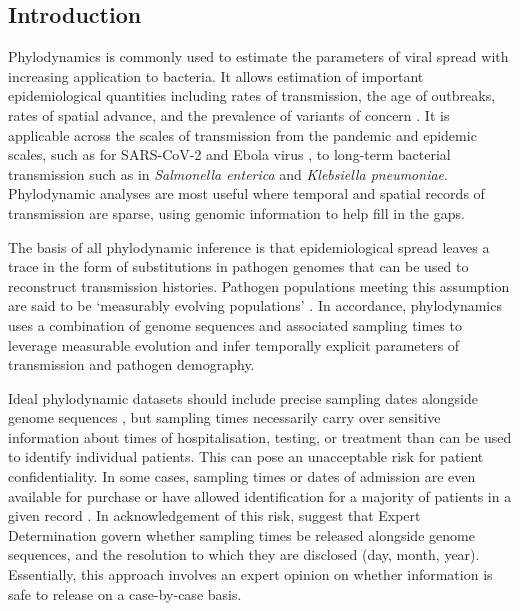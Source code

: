 \documentclass[12pt]{article}
\begin{document}
\begin{spacing}{2}

\section*{Introduction}
Phylodynamics is commonly used to estimate the parameters of viral spread with increasing application to bacteria. It allows estimation of important epidemiological quantities including rates of transmission, the age of outbreaks, rates of spatial advance, and the prevalence of variants of concern \citep{featherstone2022epidemiological, attwood2022phylogenetic, du2015getting,volz_fitness_2023}. It is applicable across the scales of transmission from the pandemic and epidemic scales, such as for SARS-CoV-2 and Ebola virus \citep{lancet2021genomic,mbala2019medical}, to long-term bacterial transmission such as in \textit{Salmonella enterica} and \textit{Klebsiella pneumoniae}. Phylodynamic analyses are most useful where temporal and spatial records of transmission are sparse, using genomic information to help fill in the gaps.

The basis of all phylodynamic inference is that epidemiological spread leaves a trace in the form of substitutions in pathogen genomes that can be used to reconstruct transmission histories. Pathogen populations meeting this assumption are said to be `measurably evolving populations' \citep{drummond2003measurably, biek_measurably_2015}. In accordance, phylodynamics uses a combination of genome sequences and associated sampling times to leverage measurable evolution and infer temporally explicit parameters of transmission and pathogen demography.

Ideal phylodynamic datasets should include precise sampling dates alongside genome sequences \citep{black2020ten}, but sampling times necessarily carry over sensitive information about times of hospitalisation, testing, or treatment than can be used to identify individual patients. This can pose an unacceptable risk for patient confidentiality. In some cases, sampling times or dates of admission are even available for purchase or have allowed identification for a majority of patients in a given record \citep{sweeney_matching_2013}. In acknowledgement of this risk, \citet{shean_private_2018} suggest that Expert Determination govern whether sampling times be released alongside genome sequences, and the resolution to which they are disclosed (day, month, year). Essentially, this approach involves an expert opinion on whether information is safe to release on a case-by-case basis.


\end{spacing}
\end{document}
